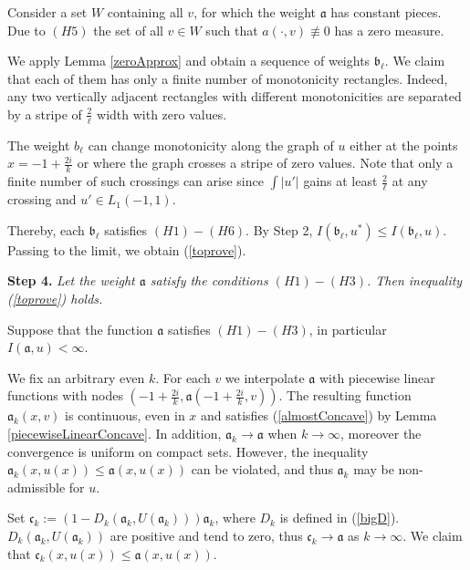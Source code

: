 \documentclass[12pt]{article}
\renewcommand{\le}{\leqslant}
\begin{document}
Consider a set $W$ containing all $v$, for which the weight $\mathfrak a$ has constant pieces.
Due to $(H5)$ the set of all  $v \in W$ such that $a(\cdot, v) \not\equiv 0$ has a zero measure.

We apply Lemma \ref{zeroApprox} and obtain a sequence of weights $\mathfrak b_{\ell}$.
We claim that each of them has only a finite number of monotonicity rectangles.
Indeed, any two vertically adjacent rectangles with different monotonicities
are separated by a stripe of $\frac{2}{\ell}$ width with zero values.

The weight $b_{\ell}$ can change monotonicity along the graph of $u$
either at the points $x = -1 + \frac{2 i}{k}$ or where the graph crosses a stripe of zero values.
Note that only a finite number of such crossings can arise since
$\int |u'|$ gains at least $\frac{2}{\ell}$ at any crossing and $u' \in L_1(-1, 1)$.

Thereby, each $\mathfrak b_{\ell}$ satisfies $(H1)-(H6)$. By Step 2, $I(\mathfrak b_{\ell}, u^*) \le I(\mathfrak b_{\ell}, u)$.
Passing to the limit, we obtain (\ref{toprove}).

\bigskip
{\bf Step 4.} {\it Let the weight $\mathfrak a$ satisfy the conditions $(H1)-(H3)$.
Then inequality (\ref{toprove}) holds.}

Suppose that the function $\mathfrak a$ satisfies $(H1)-(H3)$, in particular $I(\mathfrak a, u) < \infty$.

We fix an arbitrary even $k$.
For each $v$ we interpolate $\mathfrak a$ with piecewise linear functions
with nodes $( -1 + \frac{2i}{k}, \mathfrak a(-1 + \frac{2i}{k}, v) )$.
The resulting function $\mathfrak a_k(x, v)$ is continuous, even in $x$
and satisfies (\ref{almostConcave}) by Lemma \ref{piecewiseLinearConcave}.
In addition, $\mathfrak a_k \to \mathfrak a$ when $k \to \infty$,
moreover the convergence is uniform on compact sets.
However, the inequality $\mathfrak a_k(x, u(x)) \le \mathfrak a(x, u(x))$ can be violated,
and thus $\mathfrak a_k$ may be non-admissible for $u$.

Set $\mathfrak c_k := (1 - D_k(\mathfrak a_k, U(\mathfrak a_k))) \mathfrak a_k$, where $D_k$ is defined in (\ref{bigD}).
$D_k(\mathfrak a_k, U(\mathfrak a_k))$ are positive and tend to zero, thus $\mathfrak c_k \to \mathfrak a$ as $k \to \infty$.
We claim that $\mathfrak c_k(x, u(x)) \le \mathfrak a(x, u(x))$.
\end{document}
